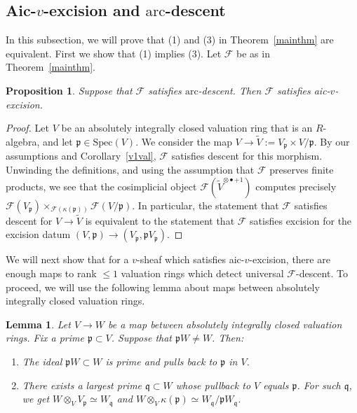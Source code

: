 \documentclass[reqno]{amsart}
\newcommand{\spec}{\mathrm{Spec}}
\newcommand{\arc}{\mathrm{arc}}
\newtheorem{proposition}[theorem]{Proposition}
\newtheorem{lemma}[theorem]{Lemma}
\theoremstyle{definition}
\begin{document}
\subsection{Aic-$v$-excision and $\arc$-descent}
\label{aicexcsec}
In this subsection, we will prove that (1) and (3) in Theorem~\ref{mainthm} are equivalent. First we show that (1) implies (3). 
Let $\mathcal{F}$ be as in Theorem~\ref{mainthm}. 
\begin{proposition} 
\label{1implies3}
Suppose that $\mathcal{F}$ satisfies $\arc$-descent. Then $\mathcal{F}$
satisfies aic-$v$-excision. 
\end{proposition} 
\begin{proof} 
Let $V$ be an absolutely integrally closed valuation ring that is an
$R$-algebra, and let
$\mathfrak{p} \in \spec(V)$. 
We consider the map 
$V \to \widetilde{V} := V_{\mathfrak{p}} \times V/\mathfrak{p}$. 
By our assumptions and Corollary~\ref{v1val}, $\mathcal{F}$
satisfies descent for this morphism. 
Unwinding the definitions, and using the assumption that $\mathcal{F}$ preserves finite
products, we see that 
the cosimplicial object $\mathcal{F}( \widetilde{V}^{\otimes \bullet + 1})$ computes
precisely $\mathcal{F}( V_{\mathfrak{p}}) \times_{\mathcal{F}( \kappa( \mathfrak{p}))} \mathcal{F}(
V/\mathfrak{p})$. In particular, the statement that $\mathcal{F}$ satisfies descent
for $V \to \widetilde{V}$ is equivalent 
to the statement that $\mathcal{F}$ satisfies excision for the excision datum 
$(V, \mathfrak{p}) \to (V_{\mathfrak{p}}, \mathfrak{p} V_{\mathfrak{p}})$. 
\end{proof} 



We will next show that for a $v$-sheaf which satisfies aic-$v$-excision, there are
enough maps to rank $\leq 1$ valuation rings which detect universal
$\mathcal{F}$-descent. 
To proceed, we will use the following lemma about maps between absolutely integrally closed valuation
rings. 

\begin{lemma}
\label{MilnorAICValRing}
Let $V \to W$ be a map between absolutely integrally closed valuation rings.
Fix a prime $\mathfrak{p} \subset V$. Suppose that $\mathfrak{p} W \neq W$.
Then:
\begin{enumerate}
\item The ideal $\mathfrak{p}W \subset W$ is prime and pulls back to
$\mathfrak{p}$ in $V$. 
\item There exists a largest prime $\mathfrak{q} \subset W$ whose pullback to $V$ equals $\mathfrak{p}$. For such $\mathfrak{q}$, we get $W \otimes_V V_{\mathfrak{p}} \simeq W_{\mathfrak{q}}$ and $W \otimes_V \kappa(\mathfrak{p}) \simeq W_{\mathfrak{q}}/\mathfrak{p}W_{\mathfrak{q}}$. 
\end{enumerate}
\end{lemma}
\end{document}
